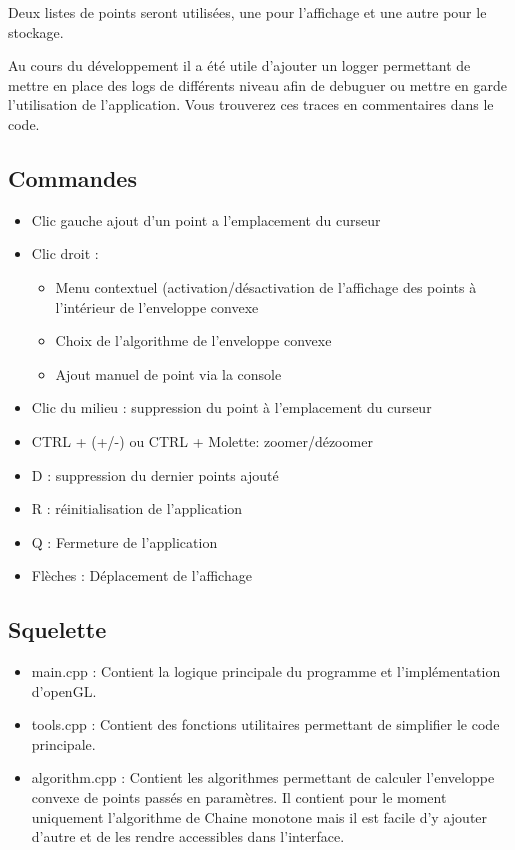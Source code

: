 \documentclass[final]{beamer}
\begin{document}
\begin{frame}[t]
\begin{multicols}{3}
Deux listes de points seront utilisées, une pour l'affichage et une autre pour le stockage.

Au cours du développement il a été utile d'ajouter un logger permettant de mettre en place des logs de différents niveau afin de debuguer ou mettre en garde l'utilisation de l'application. Vous trouverez ces traces en commentaires dans le code.

\subsection{Commandes}
\begin{itemize}
    \item  Clic gauche ajout d'un point a l'emplacement du curseur
    \item Clic droit :
    \begin{itemize}
        \item  Menu contextuel (activation/désactivation de l'affichage des points à l'intérieur de l'enveloppe convexe
        \item Choix de l'algorithme de l'enveloppe convexe
        \item Ajout manuel de point via la console
    \end{itemize}
    \item Clic du milieu : suppression du point à l'emplacement du curseur
    \item CTRL + (+/-) ou CTRL + Molette: zoomer/dézoomer
    \item D : suppression du dernier points ajouté
    \item R : réinitialisation de l'application
    \item Q : Fermeture de l'application
    \item Flèches : Déplacement de l'affichage
\end{itemize}

\subsection{Squelette}
\begin{itemize}
    \item main.cpp : Contient la logique principale du programme et l'implémentation d'openGL.
    \item tools.cpp : Contient des fonctions utilitaires permettant de simplifier le code principale.
    \item algorithm.cpp : Contient les algorithmes permettant de calculer l'enveloppe convexe de points passés en paramètres.
Il contient pour le moment uniquement l'algorithme de Chaine monotone mais il est facile d'y ajouter d'autre et de les rendre accessibles dans l'interface.
\end{itemize}


\end{multicols}
\end{frame}
\end{document}
